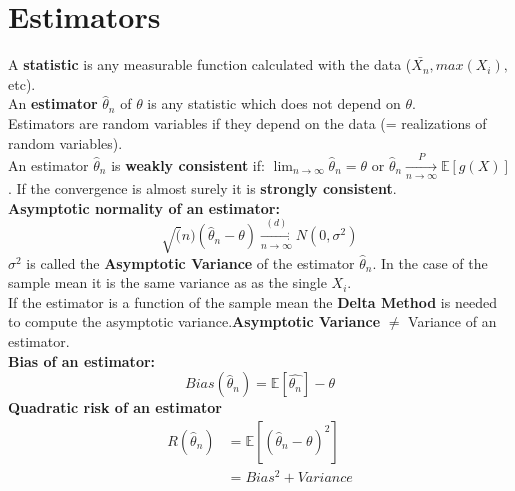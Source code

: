 \section{Estimators}

A \textbf{statistic} is any measurable function calculated with the data ($\bar{X_n}, max(X_i),$ etc).\\

An \textbf{estimator} $\hat{\theta }_ n$ of $\theta$ is any statistic which does not depend on $\theta$.\\

Estimators are random variables if they depend on the data (= realizations of random variables).\\

An estimator $\hat{\theta }_ n$ is \textbf{weakly consistent} if: $\displaystyle \lim _{n \to \infty } \hat{\theta }_ n = \theta$ or $ \hat{\theta}_n \xrightarrow[n \rightarrow \infty]{P} \mathbb{E}[g(X)]$. If the convergence is almost surely it is \textbf{strongly consistent}.\\
\textbf{Asymptotic normality of an estimator:}
\[\sqrt(n) (\hat{\theta}_n-\theta) \xrightarrow[n \rightarrow \infty]{(d)} N(0,\sigma^2)\]
$\sigma^2$ is called the \textbf{Asymptotic Variance} of the estimator $\hat{\theta}_n$. In the case of the sample mean it is the same variance as as the single $X_i$.\\
If the estimator is a function of the sample mean the \textbf{Delta Method} is needed to compute the asymptotic variance.\textbf{Asymptotic Variance} $\neq$ Variance of an estimator.\\
\textbf{Bias of an estimator:}
\[Bias(\hat{\theta}_n) = \mathbb{E}[\hat{\theta_n}] - \theta\]
\textbf{Quadratic risk of an estimator}
\begin{align*}
R(\hat{\theta}_n) & = \mathbb{E}[(\hat{\theta}_n-\theta)^2]\\
& = Bias^2 + Variance
\end{align*}